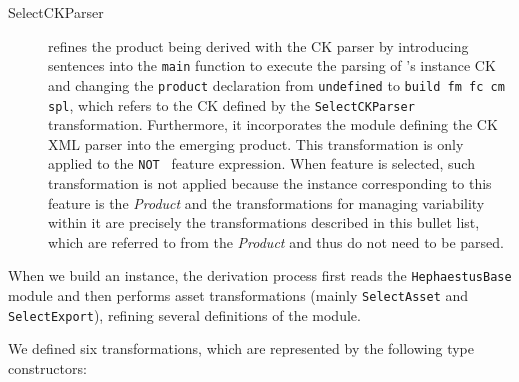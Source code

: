 \begin{description}
\item[SelectCKParser] refines the product being derived with the CK parser by introducing sentences into the \texttt{main} function to execute the parsing of \hpl's instance CK and changing the \texttt{product} declaration from \texttt{undefined} to \texttt{build fm fc cm spl}, which refers to the CK defined by the \texttt{SelectCKParser} transformation. Furthermore, it incorporates the module defining the CK XML parser into the emerging product. This transformation is only applied to the \texttt{NOT \hp{}} feature expression. When \texttt{\hp{}} feature is selected, such transformation is not applied because the instance corresponding to this feature is the \hp{} \emph{Product} and the transformations for managing variability within it are precisely the transformations described in this bullet list, which are referred to from the \hp{} \emph{Product} and thus do not need to be parsed.

\end{description}

When we build an \hpl{} instance, the derivation process first reads the \texttt{HephaestusBase} module and then performs \hp{} asset transformations (mainly \texttt{SelectAsset} and \texttt{SelectExport}), refining several definitions of the module. 

We defined six \hpl{} transformations, which are represented by the following type constructors:


